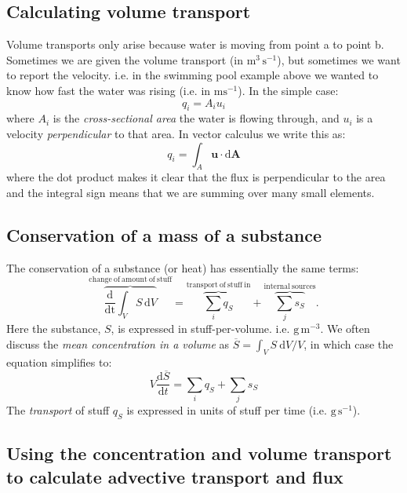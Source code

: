 \subsection{Calculating volume transport}

Volume transports only arise because water is moving from point a to point b.  Sometimes we are given the volume transport (in $\mathrm{m^3\,s^{-1}}$), but sometimes we want to report the velocity.  i.e. in the swimming pool example above we wanted to know how fast the water was rising (i.e. in $\mathrm{ms^{-1}}$).  In the simple case:
\begin{equation}
  q_i = A_i u_i
\end{equation}
where $A_i$ is the \emph{cross-sectional area} the water is flowing through, and $u_i$ is a velocity \emph{perpendicular} to that area.  In vector calculus we write this as:
\begin{equation}
  q_i = \int_A \mathbf{u}\cdot\mathrm{d}\mathbf{A}
\end{equation}
where the dot product makes it clear that the flux is perpendicular to the area and the integral sign means that we are summing over many small elements.  

\subsection{Conservation of a mass of a substance}

The conservation of a substance (or heat) has essentially the same
terms:
\begin{equation}
  \label{eq:conss}
  \overbrace{\frac{\mathrm{d}}{\mathrm{dt}}\int_VS\,\mathrm{d}V}^{\mathrm{change
    \ of\ amount\ of\ stuff}}= \overbrace{\sum_i q_{S}}^{\mathrm{transport\ of\
  stuff\ in}} +  \overbrace{\sum_j s_S}^{\mathrm{internal\ sources}}.
\end{equation}
Here the substance, $S$, is expressed in stuff-per-volume.
i.e. $\mathrm{g\,m^{-3}}$.  We often discuss the \emph{mean
  concentration in a volume} as $\overline{S} = \int_V S\ \mathrm{d}V
/V$, in which case the equation simplifies to:
\begin{equation}
  V \frac{\mathrm{d}\overline{S}}{\mathrm{d}t} = \sum_i q_{S} + \sum_j s_S
\end{equation}
The \emph{transport} of stuff $q_{S}$ is expressed in units of stuff
per time (i.e. $\mathrm{g\, s^{-1}}$).


\subsection{Using the concentration and volume transport to calculate
  advective transport and flux}

